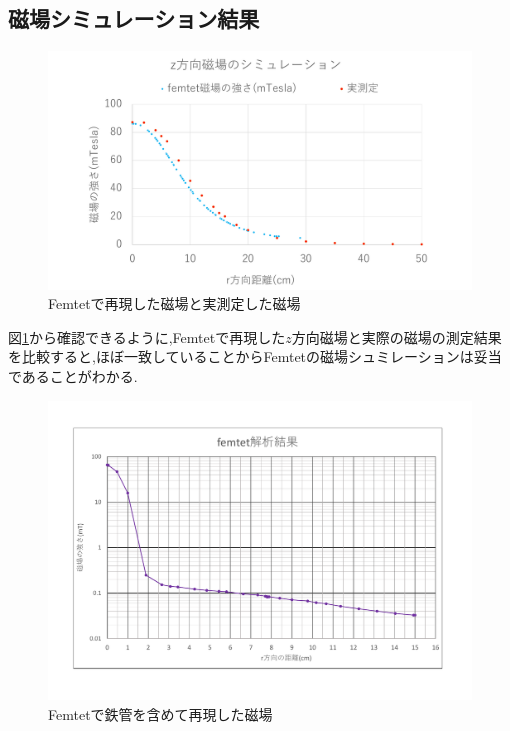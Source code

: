 \subsection{磁場シミュレーション結果}
\begin{figure}[tbp]
	\centering
		\includegraphics[width=16cm]{fig/iguchi/magnetgraph2.pdf}
	\caption{Femtetで再現した磁場と実測定した磁場}
	\label{magnetgraph2}
\end{figure}

図\ref{magnetgraph2}から確認できるように,Femtetで再現した$z$方向磁場と実際の磁場の測定結果を比較すると,ほぼ一致していることからFemtetの磁場シュミレーションは妥当であることがわかる.

\begin{figure}[tbp]
	\centering
		\includegraphics[width=15cm]{fig/iguchi/Femtetsaigengraph.pdf}
	\caption{Femtetで鉄管を含めて再現した磁場}
	\label{Femtetsaigengraph}
\end{figure}

